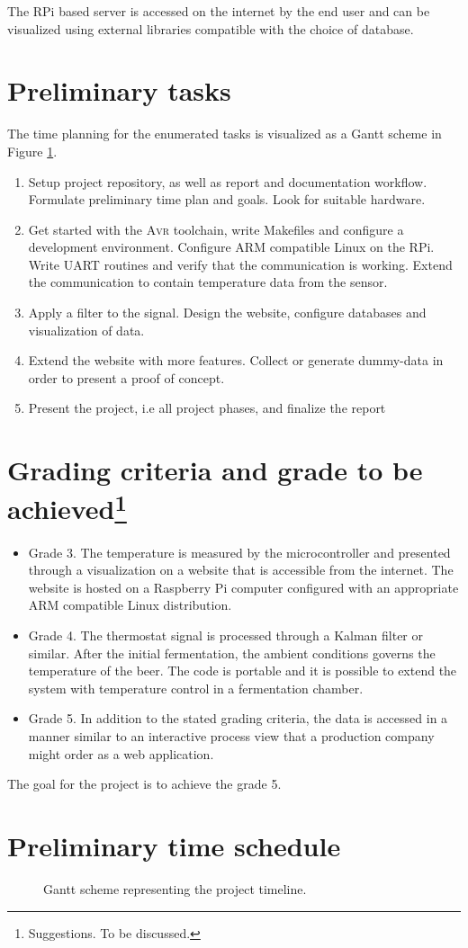 \documentclass[10pt]{article}
\newcommand{\AVR}{\textsc{Avr}\xspace}
\begin{document}
The RPi based server is accessed on the internet by the end user and can be visualized using external libraries compatible with the choice of database.
\newpage
\section*{Preliminary tasks}%
\label{sec:preliminary_tasks}
The time planning for the enumerated tasks is visualized as a Gantt scheme in Figure \ref{fig:gantt}.
\begin{enumerate}
  \item
Setup project repository, as well as report and documentation workflow. Formulate preliminary time plan and goals. Look for suitable hardware.
  \item
Get started with the \AVR toolchain, write Makefiles and configure a development environment. Configure ARM compatible Linux on the RPi. Write UART routines and verify that the communication is working. Extend the communication to contain temperature data from the sensor.
  \item
    Apply a filter to the signal. Design the website, configure databases and visualization of data.
  \item
    Extend the website with more features. Collect or generate dummy-data in order to present a proof of concept.
  \item Present the project, i.e all project phases, and finalize the report
\end{enumerate}
\section*{Grading criteria and grade to be achieved\protect\footnote{Suggestions. To be discussed.}}%
\label{sec:grading_criteria_and_grading_goal}
\begin{itemize}
  \item 
    Grade 3. The temperature is measured by the microcontroller and presented through a visualization on a website that is accessible from the internet. The website is hosted on a Raspberry Pi computer configured with an appropriate ARM compatible Linux distribution.
  \item 
   Grade 4. The thermostat signal is processed through a Kalman filter or similar. After the initial fermentation, the ambient conditions governs the temperature of the beer. The code is portable and it is possible to extend the system with temperature control in a fermentation chamber.
  \item
   Grade 5. In addition to the stated grading criteria, the data is accessed in a manner similar to an interactive process view that a production company might order as a web application.
\end{itemize}
The goal for the project is to achieve the grade 5.
\newpage
\section*{Preliminary time schedule}%
\label{sec:preliminary_time_schedule}

\begin{figure}[ht]
  \centering
  
  \caption{Gantt scheme representing the project timeline.}
  \label{fig:gantt}
\end{figure}
\end{document}
